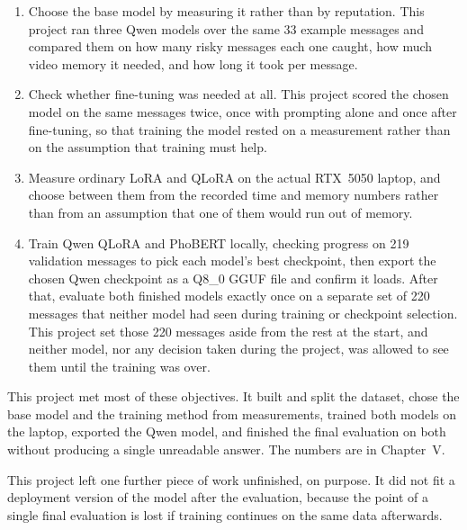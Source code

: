 \begin{enumerate}
  \item Choose the base model by measuring it rather than by reputation.
  This project ran three Qwen models over the same 33 example messages and
  compared them on how many risky messages each one caught, how much video
  memory it needed, and how long it took per message.

  \item Check whether fine-tuning was needed at all. This project scored
  the chosen model on the same messages twice, once with prompting alone
  and once after fine-tuning, so that training the model rested on a
  measurement rather than on the assumption that training must help.

  \item Measure ordinary LoRA and QLoRA on the actual RTX~5050 laptop, and
  choose between them from the recorded time and memory numbers rather than
  from an assumption that one of them would run out of memory.

  \item Train Qwen QLoRA and PhoBERT locally, checking progress on 219
  validation messages to pick each model's best checkpoint, then export the
  chosen Qwen checkpoint as a Q8\_0 GGUF file and confirm it loads. After
  that, evaluate both finished models exactly once on a separate set of 220
  messages that neither model had seen during training or checkpoint
  selection. This project set those 220 messages aside from the rest at the
  start, and neither model, nor any decision taken during the project, was
  allowed to see them until the training was over.
\end{enumerate}

This project met most of these objectives. It built and split the dataset,
chose the base model and the training method from measurements, trained
both models on the laptop, exported the Qwen model, and finished the final
evaluation on both without producing a single unreadable answer. The
numbers are in Chapter~V.

This project left one further piece of work unfinished, on purpose. It did
not fit a deployment version of the model after the evaluation, because
the point of a single final evaluation is lost if training continues on
the same data afterwards.

